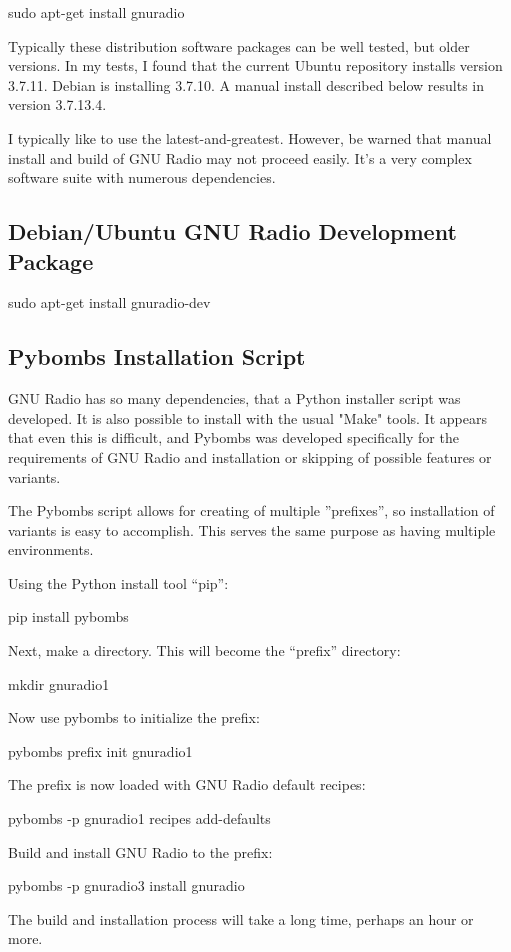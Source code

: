 sudo apt-get install gnuradio

Typically these distribution software packages can be well tested, but older versions.
In my tests, I found that the current Ubuntu repository installs version 3.7.11.  Debian is installing 3.7.10.
A manual install described below results in version 3.7.13.4.

I typically like to use the latest-and-greatest.  However, be warned that manual install
 and build of GNU Radio may not proceed easily.  It's a very complex software suite with
 numerous dependencies.

\subsection{Debian/Ubuntu GNU Radio Development Package}

sudo apt-get install gnuradio-dev

\subsection{Pybombs Installation Script}

GNU Radio has so many dependencies, that a Python installer script was developed.
It is also possible to install with the usual "Make" tools.  It appears that even
this is difficult, and Pybombs was developed specifically for the requirements of
GNU Radio and installation or skipping of possible features or variants.

The Pybombs script allows for creating of multiple ''prefixes'', so installation
of variants is easy to accomplish.  This serves the same purpose as having multiple
environments.

Using the Python install tool ``pip'':

pip install pybombs

Next, make a directory.  This will become the ``prefix'' directory:

mkdir gnuradio1

Now use pybombs to initialize the prefix:

pybombs prefix init gnuradio1

The prefix is now loaded with GNU Radio default recipes:

pybombs -p gnuradio1 recipes add-defaults

Build and install GNU Radio to the prefix:

pybombs -p gnuradio3 install gnuradio

The build and installation process will take a long time, perhaps an hour or more.

